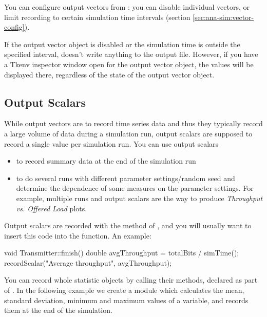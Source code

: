 You can configure output vectors from :
you can disable individual vectors, or limit recording to certain
simulation time intervals (section \ref{sec:ana-sim:vector-config}).

If the output vector object is disabled or the simulation time is
outside the specified interval,  doesn't write
anything to the output file. However, if you have a Tkenv inspector
window open for the output vector object,
the values will be displayed there, regardless of the state of the
output vector object.



\subsection{Output Scalars}

While output vectors are to record time series data and thus they
typically record a large volume of data during a simulation run,
output scalars are supposed to record a single
value per simulation run. You can use output scalars

\begin{itemize}
\item{to record summary data at the end of the simulation run}
\item{to do several runs with different parameter settings/random seed
    and determine the dependence of some measures on the parameter
    settings. For example, multiple runs and output scalars are the
    way to produce \textit{Throughput vs. Offered Load} plots.}
\end{itemize}

Output scalars are recorded with the  method of
, and you will usually want to insert this code
into the  function. An example:

\begin{cpp}
void Transmitter::finish()
{
    double avgThroughput = totalBits / simTime();
    recordScalar("Average throughput", avgThroughput);
}
\end{cpp}

You can record whole statistic objects by calling their 
methods, declared as part of . In the following example
we create a  module which calculates the mean, standard
deviation, minimum and maximum values of a variable, and records them at the
end of the simulation.

